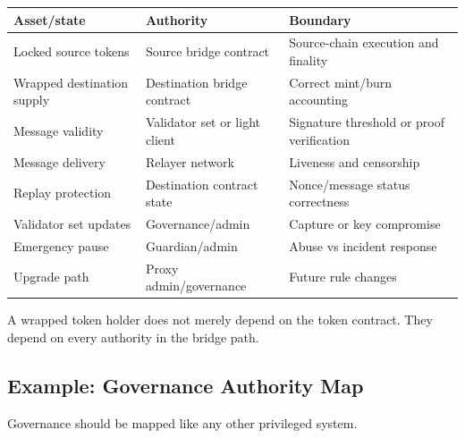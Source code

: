 {\def\LTcaptype{none} %
\begin{longtable}[]{@{}
  >{\raggedright\arraybackslash}p{}
  >{\raggedright\arraybackslash}p{}
  >{\raggedright\arraybackslash}p{}@{}}
\toprule\noalign{}
\begin{minipage}[b]{\linewidth}\raggedright
Asset/state
\end{minipage} & \begin{minipage}[b]{\linewidth}\raggedright
Authority
\end{minipage} & \begin{minipage}[b]{\linewidth}\raggedright
Boundary
\end{minipage} \\
\midrule\noalign{}
\endhead
\bottomrule\noalign{}
\endlastfoot
Locked source tokens & Source bridge contract & Source-chain execution
and finality \\
Wrapped destination supply & Destination bridge contract & Correct
mint/burn accounting \\
Message validity & Validator set or light client & Signature threshold
or proof verification \\
Message delivery & Relayer network & Liveness and censorship \\
Replay protection & Destination contract state & Nonce/message status
correctness \\
Validator set updates & Governance/admin & Capture or key compromise \\
Emergency pause & Guardian/admin & Abuse vs incident response \\
Upgrade path & Proxy admin/governance & Future rule changes \\
\end{longtable}
}

A wrapped token holder does not merely depend on the token contract.
They depend on every authority in the bridge path.

\subsection{Example: Governance Authority Map}

Governance should be mapped like any other privileged system.

